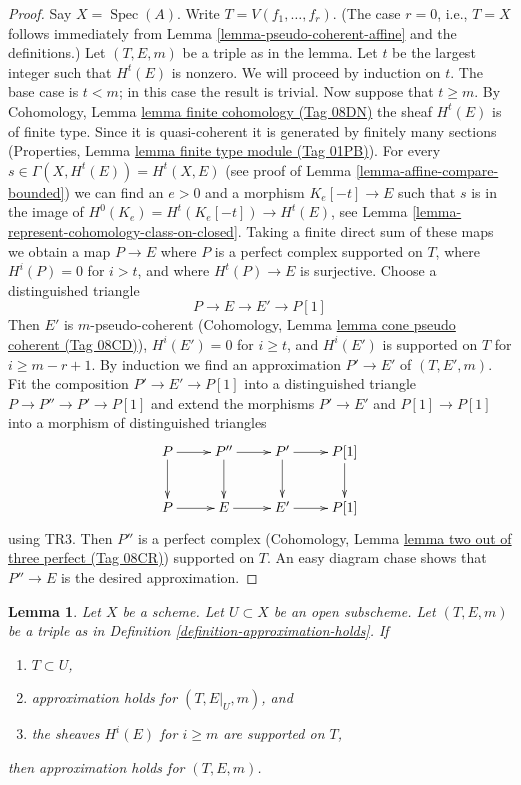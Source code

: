 \documentclass{amsart}
\theoremstyle{plain}
\newtheorem{lemma}[subsection]{Lemma}
\theoremstyle{definition}
\theoremstyle{remark}
\numberwithin{equation}{subsection}
\def\Spec{\mathop{\mathrm{Spec}}}
\begin{document}
\begin{proof}
Say $X = \Spec(A)$. Write $T = V(f_1, \ldots, f_r)$.
(The case $r = 0$, i.e., $T = X$ follows immediately from
Lemma \ref{lemma-pseudo-coherent-affine} and the definitions.)
Let $(T, E, m)$ be a triple as in the lemma.
Let $t$ be the largest integer such that $H^t(E)$ is nonzero.
We will proceed by induction on $t$. The base case is $t < m$; in
this case the result is trivial. Now suppose that $t \geq m$. By
Cohomology, Lemma \href{https://stacks.math.columbia.edu/tag/08DN}{lemma finite cohomology (Tag 08DN)}
the sheaf $H^t(E)$ is of finite type. Since it is quasi-coherent
it is generated by finitely many sections
(Properties, Lemma \href{https://stacks.math.columbia.edu/tag/01PB}{lemma finite type module (Tag 01PB)}).
For every $s \in \Gamma(X, H^t(E)) = H^t(X, E)$
(see proof of Lemma \ref{lemma-affine-compare-bounded})
we can find an $e > 0$ and a morphism $K_e[-t] \to E$
such that $s$ is in the image of
$H^0(K_e) = H^t(K_e[-t]) \to H^t(E)$, see
Lemma \ref{lemma-represent-cohomology-class-on-closed}.
Taking a finite direct sum of these maps we obtain a map
$P \to E$ where $P$ is a perfect complex supported on $T$,
where $H^i(P) = 0$ for $i > t$, and where $H^t(P) \to E$ is
surjective. Choose a distinguished triangle
$$
P \to E \to E' \to P[1]
$$
Then $E'$ is $m$-pseudo-coherent
(Cohomology, Lemma \href{https://stacks.math.columbia.edu/tag/08CD}{lemma cone pseudo coherent (Tag 08CD)}),
$H^i(E') = 0$ for $i \geq t$, and
$H^i(E')$ is supported on $T$ for $i \geq m - r + 1$.
By induction we find an approximation $P' \to E'$
of $(T, E', m)$. Fit the composition $P' \to E' \to P[1]$
into a distinguished triangle $P \to P'' \to P' \to P[1]$
and extend the morphisms $P' \to E'$ and $P[1] \to P[1]$ into
a morphism of distinguished triangles
$$
\xymatrix{
P \ar[r] \ar[d] & P'' \ar[d] \ar[r] & P' \ar[d] \ar[r] & P[1] \ar[d] \\
P \ar[r] &  E \ar[r] & E' \ar[r] & P[1]
}
$$
using TR3. Then $P''$ is a perfect complex
(Cohomology, Lemma \href{https://stacks.math.columbia.edu/tag/08CR}{lemma two out of three perfect (Tag 08CR)})
supported on $T$.
An easy diagram chase shows that $P'' \to E$ is the desired
approximation.
\end{proof}


\begin{lemma}
\label{lemma-open}
Let $X$ be a scheme. Let $U \subset X$ be an open subscheme.
Let $(T, E, m)$ be a triple as in
Definition \ref{definition-approximation-holds}.
If
\begin{enumerate}
\item $T \subset U$,
\item approximation holds for $(T, E|_U, m)$, and
\item the sheaves $H^i(E)$ for $i \geq m$ are supported on $T$,
\end{enumerate}
then approximation holds for $(T, E, m)$.
\end{lemma}
\end{document}
